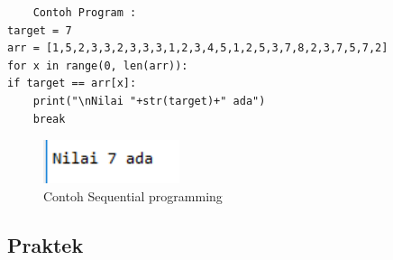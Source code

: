 \begin{enumerate}
\begin{verbatim}
    Contoh Program : 
target = 7
arr = [1,5,2,3,3,2,3,3,3,1,2,3,4,5,1,2,5,3,7,8,2,3,7,5,7,2]
for x in range(0, len(arr)):
if target == arr[x]:
    print("\nNilai "+str(target)+" ada")
    break
\end{verbatim}
\begin{figure}[H]
    \includegraphics[width=4cm]{figures/1174035/chapter6/teori_8.png}
    \centering
    \caption{Contoh Sequential programming}
\end{figure}
\end{enumerate}
\subsection{Praktek}
